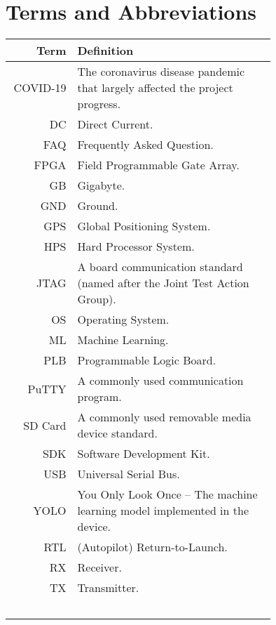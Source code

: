 \section*{Terms and Abbreviations}

\begin{tabular}[h]{rp{0.75\linewidth}}
    \hline
    \textbf{Term} & \textbf{Definition}\\
    \hline

    COVID-19 & The coronavirus disease pandemic that largely affected the project progress. \\
    DC & Direct Current. \\
	FAQ & Frequently Asked Question. \\
	FPGA & Field Programmable Gate Array. \\
	GB & Gigabyte. \\
	GND & Ground. \\
    GPS & Global Positioning System. \\
	HPS & Hard Processor System. \\
	JTAG & A board communication standard (named after the Joint Test Action Group).\\
	OS & Operating System. \\
	ML & Machine Learning. \\
	PLB & Programmable Logic Board. \\
	PuTTY & A commonly used communication program. \\
    SD Card & A commonly used removable media device standard. \\
    SDK & Software Development Kit. \\
    USB & Universal Serial Bus. \\
	YOLO & You Only Look Once -- The machine learning model implemented in the device.\\
    RTL & (Autopilot) Return-to-Launch.\\
    RX & Receiver.\\
    TX & Transmitter.\\\

    \hline

\end{tabular}
